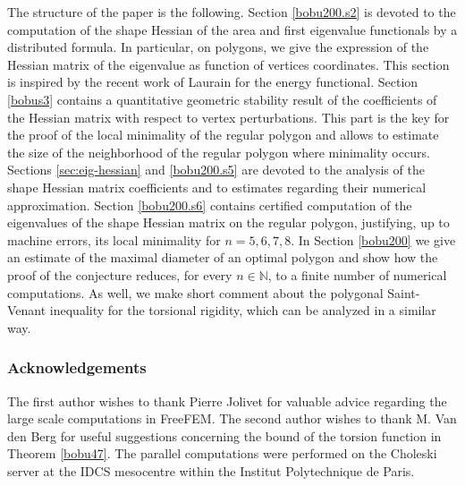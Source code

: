 \documentclass[11pt]{article}
\numberwithin{equation}{section}\newtheorem*{jepEnonce}{\jepEnonceTitle}\newenvironment{enonce*}[1]{\def\jepEnonceTitle{#1}\jepEnonce}{\endjepEnonce}\newtheorem*{conj*}{Conjecture}
\theoremstyle{plain}
\theoremstyle{definition}
\def\N{\mathbb{N}}
\begin{document}
\smallskip
The structure of the paper is the following. Section \ref{bobu200.s2}
is devoted to the computation of the shape Hessian of the area and first eigenvalue functionals by a distributed formula. In particular, on polygons, we give the expression of the Hessian matrix of the eigenvalue as function of vertices coordinates. This section is inspired by the recent work of Laurain \cite{laurain2ndDeriv} for the energy functional. Section \ref{bobus3} contains a quantitative geometric stability result of the coefficients of the Hessian matrix with respect to vertex perturbations. This part is the key for the proof of the local minimality of the regular polygon and allows to estimate the size of the neighborhood of the regular polygon where minimality occurs. Sections \ref{sec:eig-hessian} and \ref{bobu200.s5} are devoted to the analysis of the shape Hessian matrix coefficients and to estimates regarding their numerical approximation. Section \ref{bobu200.s6} contains certified computation of the eigenvalues of the shape Hessian matrix on the regular polygon, justifying, up to machine errors, its local minimality for $n= 5, 6, 7, 8$. In Section \ref{bobu200} we give an estimate of the maximal diameter of an optimal polygon and show how the proof of the conjecture reduces, for every $n \in \N$, to a finite number of numerical computations. As well, we make short comment about the polygonal Saint-Venant inequality for the torsional rigidity, which can be analyzed in a similar way.

\subsubsection*{Acknowledgements}
The first author wishes to thank Pierre Jolivet for valuable advice regarding the large scale computations in FreeFEM. The second author wishes to thank M. Van den Berg for useful suggestions concerning the bound of the torsion function in Theorem \ref{bobu47}. The parallel computations were performed on the Choleski server at the IDCS mesocentre within the Institut Polytechnique de Paris.
\end{document}
